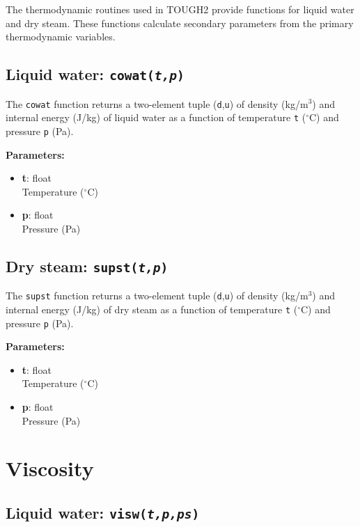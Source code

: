 The thermodynamic routines used in TOUGH2 provide functions for liquid water and dry steam.  These functions calculate secondary parameters from the primary thermodynamic variables.

\subsection{Liquid water: \texttt{cowat(\emph{t,p})}}

The \texttt{cowat} function returns a two-element tuple (\texttt{d},\texttt{u}) of density (kg/m$^3$) and internal energy (J/kg) of liquid water as a function of temperature \texttt{t} ($^{\circ}$C) and pressure \texttt{p} (Pa).

\textbf{Parameters:}
\begin{itemize}
\item \textbf{t}: float\\
  Temperature ($^{\circ}$C)
\item \textbf{p}: float\\
  Pressure (Pa)
\end{itemize}

\subsection{Dry steam: \texttt{supst(\emph{t,p})}}

The \texttt{supst} function returns a two-element tuple (\texttt{d},\texttt{u}) of density (kg/m$^3$) and internal energy (J/kg) of dry steam as a function of temperature \texttt{t} ($^{\circ}$C) and pressure \texttt{p} (Pa).

\textbf{Parameters:}
\begin{itemize}
\item \textbf{t}: float\\
  Temperature ($^{\circ}$C)
\item \textbf{p}: float\\
  Pressure (Pa)
\end{itemize}

\section{Viscosity}

\subsection{Liquid water: \texttt{visw(\emph{t,p,ps})}}

